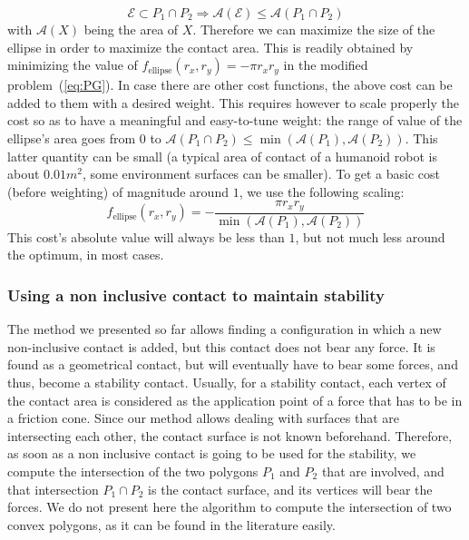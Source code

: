 \begin{equation}
\mathcal{E} \subset P_1 \cap P_2 \Longrightarrow  \mathcal{A}(\mathcal{E}) \le \mathcal{A}(P_1 \cap P_2)
\end{equation}
with $\mathcal{A}(X)$ being the area of $X$.\newline
Therefore we can maximize the size of the ellipse in order to maximize the contact area.
This is readily obtained by minimizing the value of $f_{\text{ellipse}}(r_x, r_y) = -\pi r_x r_y$ in the modified problem~(\ref{eq:PG}).
In case there are other cost functions, the above cost can be added to them with a desired weight.
This requires however to scale properly the cost so as to have a meaningful and easy-to-tune weight: the range of value of the ellipse's area goes from $0$ to $\mathcal{A}(P_1 \cap P_2) \leq \min (\mathcal{A}(P_1), \mathcal{A}(P_2))$.
This latter quantity can be small (a typical area of contact of a humanoid robot is about $0.01m^2$, some environment surfaces can be smaller).
To get a basic cost (before weighting) of magnitude around $1$, we use the following scaling:
\begin{equation}
f_\text{ellipse}(r_x, r_y) = - \frac{\pi r_x r_y}{\min (\mathcal{A}(P_1), \mathcal{A}(P_2))}
\label{eq:cost-ellipse}
\end{equation}
This cost's absolute value will always be less than $1$, but not much less around the optimum, in most cases.


\subsubsection{Using a non inclusive contact to maintain stability}
\label{subsubsec:stability}


The method we presented so far allows finding a configuration in which a new non-inclusive contact is added, but this contact does not bear any force.
It is found as a geometrical contact, but will eventually have to bear some forces, and thus, become a stability contact.
Usually, for a stability contact, each vertex of the contact area is considered as the application point of a force that has to be in a friction cone.
Since our method allows dealing with surfaces that are intersecting each other, the contact surface is not known beforehand.
Therefore, as soon as a non inclusive contact is going to be used for the stability, we compute the intersection of the two polygons $P_1$ and $P_2$ that are involved, and that intersection $P_1 \cap P_2$ is the contact surface, and its vertices will bear the forces.
We do not present here the algorithm to compute the intersection of two convex polygons, as it can be found in the literature easily.

